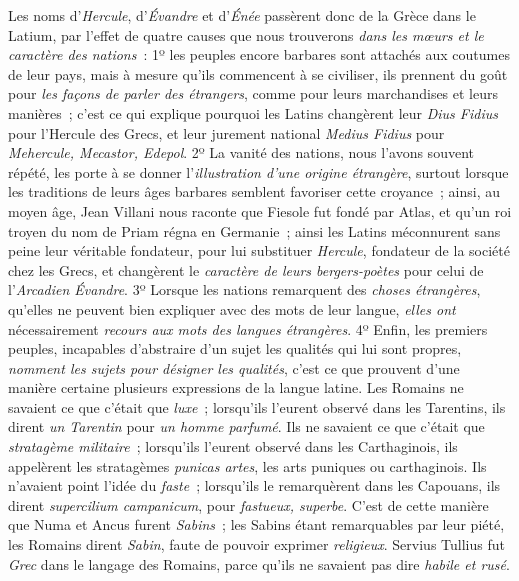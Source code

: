 \documentclass[french,twoside]{book} %
\begin{document}
{Les noms d’{\itshape Hercule}, d’{\itshape Évandre} et d’{\itshape Énée} passèrent donc de la Grèce dans le Latium, par l’effet de quatre causes que nous trouverons {\itshape dans les mœurs et le caractère des nations} : 1º les peuples encore barbares sont attachés aux coutumes de leur pays, mais à mesure qu’ils commencent à se civiliser, ils prennent du goût pour {\itshape les façons de parler des étrangers}, comme pour leurs marchandises et leurs manières ; c’est ce qui explique pourquoi les Latins changèrent leur {\itshape Dius Fidius} pour l’Hercule des Grecs, et leur jurement national {\itshape Medius Fidius} pour {\itshape Mehercule, Mecastor, Edepol}. 2º La vanité des nations, nous l’avons souvent répété, les porte à se donner l’{\itshape illustration d’une origine étrangère}, surtout lorsque les traditions de leurs âges barbares semblent favoriser cette croyance ; ainsi, au moyen âge, Jean Villani nous raconte que Fiesole fut fondé par Atlas, et qu’un roi troyen du nom de Priam régna en Germanie ; ainsi les Latins méconnurent sans peine leur véritable fondateur, pour lui substituer {\itshape Hercule}, fondateur de la société chez les Grecs, et changèrent le {\itshape caractère de leurs bergers-poètes} pour celui de l’{\itshape Arcadien Évandre}. 3º Lorsque les nations remarquent des {\itshape choses étrangères}, qu’elles ne peuvent bien expliquer avec des mots de leur langue, {\itshape elles ont} nécessairement {\itshape recours aux mots des langues étrangères}. 4º Enfin, les premiers peuples, incapables d’abstraire d’un sujet les qualités qui lui sont propres, {\itshape nomment les sujets pour désigner les qualités}, c’est ce que prouvent d’une manière certaine plusieurs expressions de la langue latine. Les Romains ne savaient ce que c’était que {\itshape luxe} ; lorsqu’ils l’eurent observé dans les Tarentins, ils dirent {\itshape un Tarentin} pour {\itshape un homme parfumé}. Ils ne savaient ce que c’était que {\itshape stratagème militaire} ; lorsqu’ils l’eurent observé dans les Carthaginois, ils appelèrent les stratagèmes {\itshape punicas artes}, les arts puniques ou carthaginois. Ils n’avaient point l’idée du {\itshape faste} ; lorsqu’ils le remarquèrent dans les Capouans, ils dirent {\itshape supercilium campanicum}, pour {\itshape fastueux, superbe}. C’est de cette manière que Numa et Ancus furent {\itshape Sabins} ; les Sabins étant remarquables par leur piété, les Romains dirent {\itshape Sabin}, faute de pouvoir exprimer {\itshape religieux}. Servius Tullius fut {\itshape Grec} dans le langage des Romains, parce qu’ils ne savaient pas dire {\itshape habile et rusé}.\par
}
\end{document}
